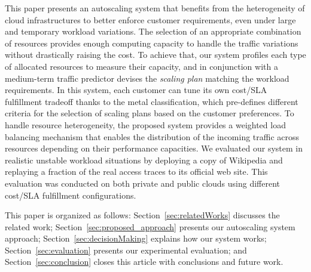 This paper presents an autoscaling system that benefits from the
heterogeneity of cloud infrastructures to better enforce customer
requirements, even under large and temporary workload variations. The
selection of an appropriate combination of resources provides enough
computing capacity to handle the traffic variations without
drastically raising the cost. To achieve that, our system profiles
each type of allocated resources to measure their capacity, and in
conjunction with a medium-term traffic predictor devises
the \emph{scaling plan} matching the workload
requirements. In this system, each customer can tune its own cost/SLA
fulfillment tradeoff thanks to the metal classification, which
pre-defines different criteria for the selection of scaling plans
based on the customer preferences. To handle resource heterogeneity,
the proposed system provides a weighted load balancing mechanism that
enables the distribution of the incoming traffic across resources depending
on their performance capacities. We evaluated our system in realistic
unstable workload situations by deploying a copy of Wikipedia and
replaying a fraction of the real access traces to its official web
site. This evaluation was conducted on both private and public clouds
using different cost/SLA fulfillment configurations.

This paper is organized as follows: Section~\ref{sec:relatedWorks} discusses
the related work; Section~\ref{sec:proposed_approach} presents our
autoscaling system approach; Section~\ref{sec:decisionMaking} explains
how our system works; Section~\ref{sec:evaluation} presents
our experimental evaluation; and Section~\ref{sec:conclusion} closes this article with conclusions and future work.
